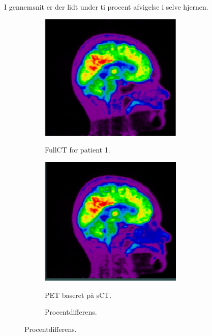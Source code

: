I gennemsnit er der lidt under ti procent afvigelse i selve hjernen.

\begin{figure}
    \centering
    \begin{subfigure}[b]{0.3\textwidth}
        \caption{FullCT for patient 1.}
        \includegraphics[width=0.75\textwidth]{colager/loocv_pet/loocv_010476_pet_ct.png}
        \label{col:loocv_pet_pat1_ct}
    \end{subfigure}\hfill
    \begin{subfigure}[b]{0.3\textwidth}
        \caption{PET baseret på sCT.}
        \includegraphics[width=0.75\textwidth]{colager/loocv_pet/loocv_010476_pet_sct.png}
        \label{col:loocv_pet_pat1_sct}
    \end{subfigure}\hfill
    \begin{subfigure}[b]{0.3\textwidth}
        \caption{Procentdifferens.}

\end{subfigure}
\end{figure}
